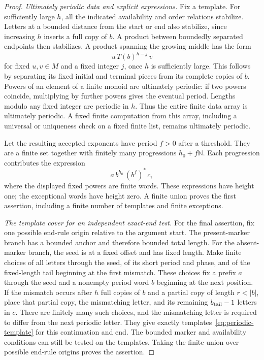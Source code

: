 \begin{proof}
\emph{Ultimately periodic data and explicit expressions.}
Fix a template.  For sufficiently large $h$, all the indicated
availability and order relations stabilize.  Letters at a bounded
distance from the start or end also stabilize, since increasing $h$
inserts a full copy of $b$.  A product between boundedly separated
endpoints then stabilizes.  A product spanning the growing middle has
the form
\[
 u\,T(b)^{h-j}\,v
\]
for fixed $u,v\in M$ and a fixed integer $j$, once $h$ is sufficiently
large.  This follows by separating its fixed initial and terminal pieces
from its complete copies of $b$.  Powers of an element of a finite monoid
are ultimately periodic: if two powers coincide, multiplying by further
powers gives the eventual period.  Lengths modulo any fixed integer are
periodic in $h$.  Thus the entire finite data array is ultimately
periodic.  A fixed finite computation from this array, including a
universal or uniqueness check on a fixed finite list, remains ultimately
periodic.

Let the resulting accepted exponents have period $f>0$ after a threshold.
They are a finite set together with finitely many progressions
$h_0+f\mathbb N$.  Each progression contributes the expression
\[
 a\,b^{h_0}\,(b^f)^*\,c,
\]
where the displayed fixed powers are finite words.  These expressions
have height one; the exceptional words have height zero.  A finite union
proves the first assertion, including a finite number of templates and
finite exceptions.

\emph{The template cover for an independent exact-end test.}
For the final assertion, fix one possible end-rule origin relative to the
argument start.  The present-marker branch has a bounded anchor and
therefore bounded total length.  For the absent-marker branch, the seed
is at a fixed offset and has fixed length.  Make finite choices of all
letters through the seed, of its short period and phase, and of the
fixed-length tail beginning at the first mismatch.  These choices fix
a prefix $a$ through the seed and a nonempty period word $b$ beginning
at the next position.  If the mismatch occurs after $h$ full copies of
$b$ and a partial copy of length $r<|b|$, place that partial copy, the
mismatching letter, and its remaining $b_{\rm tail}-1$ letters in $c$.
There are finitely many such choices, and the mismatching letter is
required to differ from the next periodic letter.  They give exactly
templates~\eqref{eq:periodic-template} for this continuation and end.
The bounded marker and availability conditions can still be tested on
the templates.  Taking the finite union over possible end-rule origins
proves the assertion.
\end{proof}

